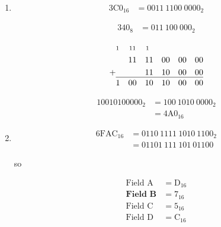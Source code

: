 \documentclass[12pt,letterpaper]{article}
\begin{document}
\begin{enumerate}
\item \begin{align*}
  3\text{C}0_{16} &= 0011\ 1100\ 0000_2
\end{align*}

  \begin{align*}
    340_8 &= 011\ 100\ 000_2
  \end{align*}

  \begin{alignat*}{12}
    & \text{\scriptsize 1} & \text{\scriptsize 1} & \text{\scriptsize 1} & \text{\scriptsize 1} & & & & & & & \\
    & & 1 & 1 & 1 & 1 & 0 & 0 & 0 & 0 & 0 & 0 \\
    + & & & & 1 & 1 & 1 & 0 & 0 & 0 & 0 & 0 \\[-1.2em]
    \cline{2-12} \\[-2em]
    & 1 & 0 & 0 & 1 & 0 & 1 & 0 & 0 & 0 & 0 & 0
  \end{alignat*}

  \begin{align*}
    10010100000_2 &= 100\ 1010\ 0000_2 \\
    &= 4\text{A}0_{16}
  \end{align*}

\item \begin{align*}
  6\text{FAC}_{16} &= 0110\ 1111\ 1010\ 1100_2 \\
  &= 01101\ 111\ 101\ 01100
\end{align*}

  so

  \begin{align*}
    \text{Field A} &= \text{D}_{16} \\
    \textbf{Field B} &= 7_{16} \\
    \text{Field C} &= 5_{16} \\
    \text{Field D} &= \text{C}_{16}
  \end{align*}

\end{enumerate}
\end{document}
